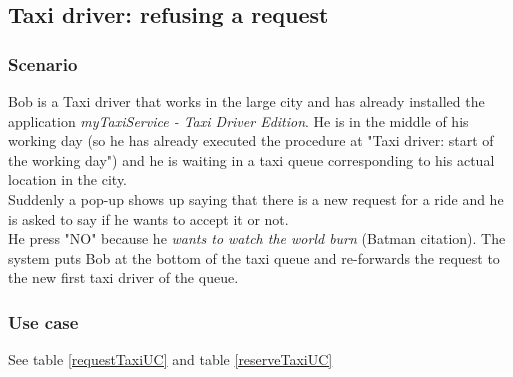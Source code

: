 \subsection{Taxi driver: refusing a request}
\subsubsection{Scenario}
Bob is a Taxi driver that works in the large city and has already installed the application \textit{myTaxiService - Taxi Driver Edition}.
He is in the middle of his working day (so he has already executed the procedure at "Taxi driver: start of the working day") and he is waiting in a taxi queue corresponding to his actual location in the city.\\
Suddenly a pop-up shows up saying that there is a new request for a ride and he is asked to say if he wants to accept it or not.\\
He press "NO" because he \textit{wants to watch the world burn} (Batman citation). The system puts Bob at the bottom of the taxi queue and re-forwards the request to the new first taxi driver of the queue.

\subsubsection{Use case}
See table \ref{requestTaxiUC} and table \ref{reserveTaxiUC}